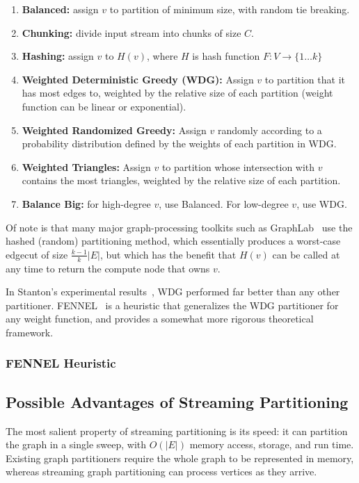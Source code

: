 \documentclass[11pt]{article}
\begin{document}
\begin{enumerate}
\item \textbf{Balanced:} assign $v$ to partition of minimum size, with random tie breaking.
\item \textbf{Chunking:} divide input stream into chunks of size $C$.
\item \textbf{Hashing:} assign $v$ to $H(v)$, where $H$ is hash function $F:V\to\{1\dots k\}$
\item \textbf{Weighted Deterministic Greedy (WDG):} Assign $v$ to partition that it has most edges to, weighted by the relative size of each partition (weight function can be linear or exponential).
\item \textbf{Weighted Randomized Greedy:} Assign $v$ randomly according to a probability distribution defined by the weights of each partition in WDG.
\item \textbf{Weighted Triangles:} Assign $v$ to partition whose intersection with $v$ contains the most triangles, weighted by the relative size of each partition.
\item \textbf{Balance Big:} for high-degree $v$, use Balanced. For low-degree $v$, use WDG. 
\end{enumerate}

Of note is that many major graph-processing toolkits such as GraphLab~\cite{Low:2012:DGF:2212351.2212354} use the hashed (random) partitioning method, which essentially produces a worst-case edgecut of size $\frac{k-1}{k}|E|$, but which has the benefit that $H(v)$ can be called at any time to return the compute node that owns $v$. 

In Stanton's experimental results~\cite{Stanton:2012:SGP:2339530.2339722}, WDG performed far better than any other partitioner. FENNEL~\cite{tsourakakis2012fennel} is a heuristic that generalizes the WDG partitioner for any weight function, and provides a somewhat more rigorous theoretical framework. 

\subsubsection{FENNEL Heuristic}

\subsection{Possible Advantages of Streaming Partitioning}
The most salient property of streaming partitioning is its speed: it can partition the graph in a single sweep, with $O(|E|)$ memory access, storage, and run time. Existing graph partitioners require the whole graph to be represented in memory, whereas streaming graph partitioning can process vertices as they arrive.
\end{document}
